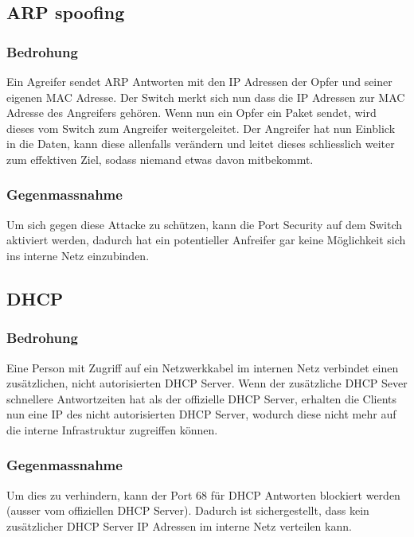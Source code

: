 \documentclass[11pt,a4paper,parskip=half]{scrartcl}
\begin{document}
\subsection{ARP spoofing}
\subsubsection{Bedrohung}
Ein Agreifer sendet ARP Antworten mit den IP Adressen der Opfer und seiner eigenen MAC Adresse. Der Switch merkt sich nun dass die IP Adressen zur MAC Adresse des Angreifers gehören. Wenn nun ein Opfer ein Paket sendet, wird dieses vom Switch zum Angreifer weitergeleitet. Der Angreifer hat nun Einblick in die Daten, kann diese allenfalls verändern und leitet dieses schliesslich weiter zum effektiven Ziel, sodass niemand etwas davon mitbekommt.
\subsubsection{Gegenmassnahme}
Um sich gegen diese Attacke zu schützen, kann die Port Security auf dem Switch aktiviert werden, dadurch hat ein potentieller Anfreifer gar keine Möglichkeit sich ins interne Netz einzubinden.

\subsection{DHCP}
\subsubsection{Bedrohung}
Eine Person mit Zugriff auf ein Netzwerkkabel im internen Netz verbindet einen zusätzlichen, nicht autorisierten DHCP Server. Wenn der zusätzliche DHCP Sever schnellere Antwortzeiten hat als der offizielle DHCP Server, erhalten die Clients nun eine IP des nicht autorisierten DHCP Server, wodurch diese nicht mehr auf die interne Infrastruktur zugreiffen können.
\subsubsection{Gegenmassnahme}
Um dies zu verhindern, kann der Port 68 für DHCP Antworten blockiert werden (ausser vom offiziellen DHCP Server). Dadurch ist sichergestellt, dass kein zusätzlicher DHCP Server IP Adressen im interne Netz verteilen kann.
\end{document}
